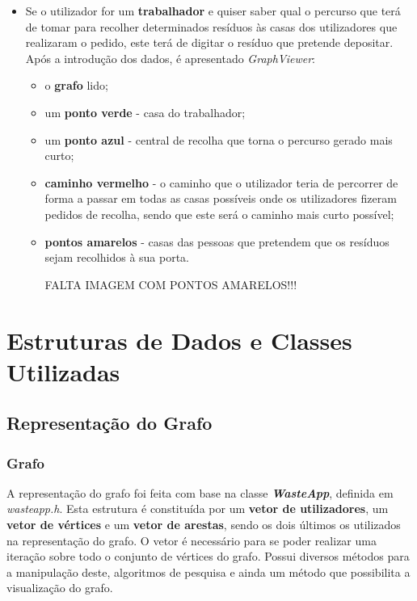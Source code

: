 \documentclass[article, a4paper, 12pt, oneside]{memoir}
\begin{document}
\begin{itemize}
	\item Se o utilizador for um \textbf{trabalhador} e quiser saber qual o percurso que terá de tomar para recolher determinados resíduos às casas dos utilizadores que realizaram o pedido, este terá de digitar o resíduo que pretende depositar. Após a introdução dos dados, é apresentado \textit{GraphViewer}:
	\begin{itemize}
		\item o \textbf{grafo} lido;
		\item um \textbf{ponto verde} - casa do trabalhador;
		\item um \textbf{ponto azul} - central de recolha que torna o percurso gerado mais curto;
		\item \textbf{caminho vermelho} - o caminho que o utilizador teria de percorrer de forma a passar em todas as casas possíveis onde os utilizadores fizeram pedidos de recolha, sendo que este será o caminho mais curto possível;
		\item \textbf{pontos amarelos} - casas das pessoas que pretendem que os resíduos sejam recolhidos à sua porta.
		
		{\Large FALTA IMAGEM COM PONTOS AMARELOS!!!}
		
	\end{itemize}
	
\end{itemize}


\newpage
\chapter[Estruturas de Dados  e Classes Utilizadas][Estruturas de Dados e Classes Utilizadas]{Estruturas de Dados e Classes Utilizadas} \label{\thechapter}

\section{Representação do Grafo}

\subsection{Grafo}

A representação do grafo foi feita com base na classe \textbf{\textit{WasteApp}}, definida em \textit{wasteapp.h}.  Esta estrutura é constituída por um \textbf{vetor de utilizadores}, um \textbf{vetor de vértices} e um \textbf{vetor de arestas}, sendo os dois últimos os utilizados na representação do grafo. O vetor é necessário para se poder realizar uma iteração sobre todo o conjunto de vértices do grafo. Possui diversos métodos para a manipulação deste, algoritmos de pesquisa e ainda um método que possibilita a visualização do grafo.
\end{document}
